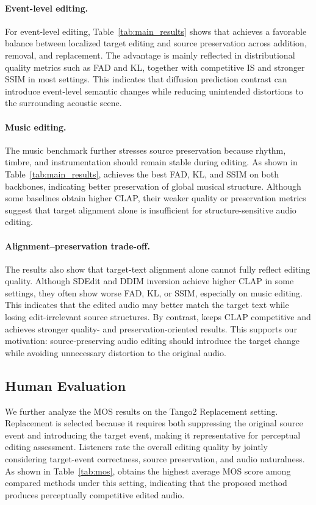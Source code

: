 \paragraph{Event-level editing.}
For event-level editing, Table~\ref{tab:main_results} shows that \ourmethod{} achieves a favorable balance between localized target editing and source preservation across addition, removal, and replacement. The advantage is mainly reflected in distributional quality metrics such as FAD and KL, together with competitive IS and stronger SSIM in most settings. This indicates that diffusion prediction contrast can introduce event-level semantic changes while reducing unintended distortions to the surrounding acoustic scene.

\paragraph{Music editing.}
The music benchmark further stresses source preservation because rhythm, timbre, and instrumentation should remain stable during editing.
As shown in Table~\ref{tab:main_results}, \ourmethod{} achieves the best FAD, KL, and SSIM on both backbones, indicating better preservation of global musical structure.
Although some baselines obtain higher CLAP, their weaker quality or preservation metrics suggest that target alignment alone is insufficient for structure-sensitive audio editing.

\paragraph{Alignment--preservation trade-off.}
The results also show that target-text alignment alone cannot fully reflect editing quality.
Although SDEdit and DDIM inversion achieve higher CLAP in some settings, they often show worse FAD, KL, or SSIM, especially on music editing.
This indicates that the edited audio may better match the target text while losing edit-irrelevant source structures.
By contrast, \ourmethod{} keeps CLAP competitive and achieves stronger quality- and preservation-oriented results.
This supports our motivation: source-preserving audio editing should introduce the target change while avoiding unnecessary distortion to the original audio.

\subsection{Human Evaluation}
We further analyze the MOS results on the Tango2 Replacement setting. Replacement is selected because it requires both suppressing the original source event and introducing the target event, making it representative for perceptual editing assessment. Listeners rate the overall editing quality by jointly considering target-event correctness, source preservation, and audio naturalness. As shown in Table~\ref{tab:mos}, \ourmethod{} obtains the highest average MOS score among compared methods under this setting, indicating that the proposed method produces perceptually competitive edited audio.

